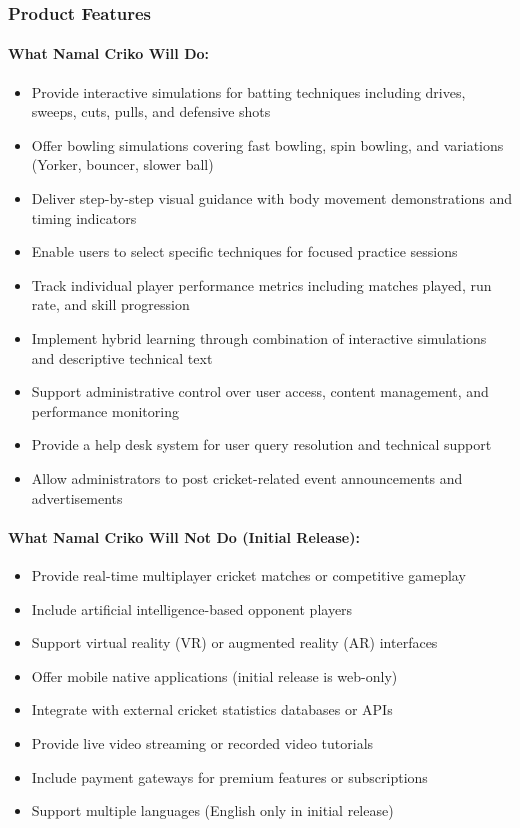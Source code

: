 \documentclass[12pt,a4paper]{article}
\begin{document}
\subsubsection{Product Features}
\paragraph{What Namal Criko Will Do:}
\begin{itemize}
    \item Provide interactive simulations for batting techniques including drives, sweeps, cuts, pulls, and defensive shots
    \item Offer bowling simulations covering fast bowling, spin bowling, and variations (Yorker, bouncer, slower ball)
    \item Deliver step-by-step visual guidance with body movement demonstrations and timing indicators
    \item Enable users to select specific techniques for focused practice sessions
    \item Track individual player performance metrics including matches played, run rate, and skill progression
    \item Implement hybrid learning through combination of interactive simulations and descriptive technical text
    \item Support administrative control over user access, content management, and performance monitoring
    \item Provide a help desk system for user query resolution and technical support
    \item Allow administrators to post cricket-related event announcements and advertisements
\end{itemize}

\paragraph{What Namal Criko Will Not Do (Initial Release):}
\begin{itemize}
    \item Provide real-time multiplayer cricket matches or competitive gameplay
    \item Include artificial intelligence-based opponent players
    \item Support virtual reality (VR) or augmented reality (AR) interfaces
    \item Offer mobile native applications (initial release is web-only)
    \item Integrate with external cricket statistics databases or APIs
    \item Provide live video streaming or recorded video tutorials
    \item Include payment gateways for premium features or subscriptions
    \item Support multiple languages (English only in initial release)
\end{itemize}
\end{document}
